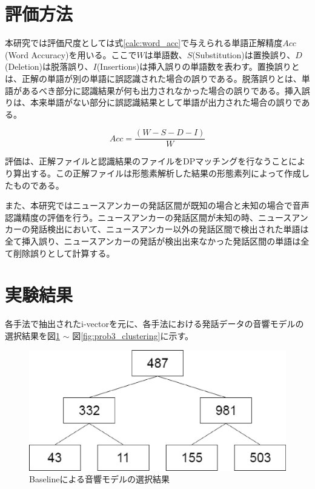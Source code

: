 \section{評価方法}
本研究では評価尺度としては式\ref{calc:word_acc}で与えられる単語正解精度$Acc$(Word Accuracy)を用いる。ここで$W$は単語数、$S$(Substitution)は置換誤り、$D$(Deletion)は脱落誤り、$I$(Insertions)は挿入誤りの単語数を表わす。置換誤りとは、正解の単語が別の単語に誤認識された場合の誤りである。脱落誤りとは、単語があるべき部分に認識結果が何も出力されなかった場合の誤りである。挿入誤りは、本来単語がない部分に誤認識結果として単語が出力された場合の誤りである。

\begin{equation}
\label{calc:word_acc}
Acc=\frac{(W-S-D-I)}{W}
\end{equation}

          
評価は、正解ファイルと認識結果のファイルをDPマッチングを行なうことにより算出する。この正解ファイルは形態素解析した結果の形態素列によって作成したものである。


また、本研究ではニュースアンカーの発話区間が既知の場合と未知の場合で音声認識精度の評価を行う。ニュースアンカーの発話区間が未知の時、ニュースアンカーの発話検出において、ニュースアンカー以外の発話区間で検出された単語は全て挿入誤り、ニュースアンカーの発話が検出出来なかった発話区間の単語は全て削除誤りとして計算する。

\section{実験結果}
各手法で抽出されたi-vectorを元に、各手法における発話データの音響モデルの選択結果を図\ref{fig:baseline_clustering} $\sim$ 図\ref{fig:prob3_clustering}に示す。

\begin{figure}[H]
  \begin{center}
    \includegraphics[scale=0.5]{./figure/baseline_clustering.eps}
  \end{center}
  \caption{Baselineによる音響モデルの選択結果 \label{fig:baseline_clustering}}
\end{figure}

